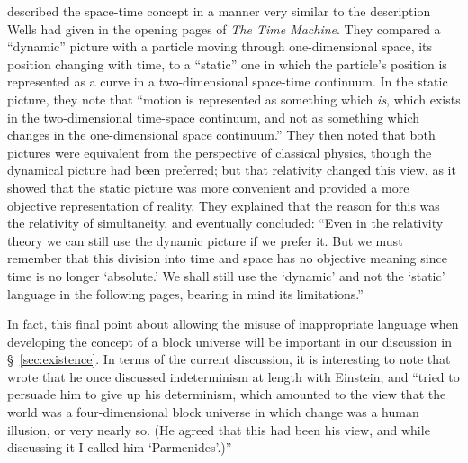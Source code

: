 \documentclass[aps,rmp,groupedaddress,twocolumn,10pt]{revtex4-2}
\begin{document}
\citet{Einstein1938} described the space-time concept in a manner very similar to the description Wells had given in the opening pages of \textit{The Time Machine}. They compared a ``dynamic'' picture with a particle moving through one-dimensional space, its position changing with time, to a ``static'' one in which the particle's position is represented as a curve in a two-dimensional space-time continuum. In the static picture, they note that ``motion is represented as something which \textit{is}, which exists in the two-dimensional time-space continuum, and not as something which changes in the one-dimensional space continuum.'' They then noted that both pictures were equivalent from the perspective of classical physics, though the dynamical picture had been preferred; but that relativity changed this view, as it showed that the static picture was more convenient and provided a more objective representation of reality. They explained that the reason for this was the relativity of simultaneity, and eventually concluded: ``Even in the relativity theory we can still use the dynamic picture if we prefer it. But we must remember that this division into time and space has no objective meaning since time is no longer `absolute.' We shall still use the `dynamic' and not the `static' language in the following pages, bearing in mind its limitations.''

In fact, this final point about allowing the misuse of inappropriate language when developing the concept of a block universe will be important in our discussion in \S~\ref{sec:existence}. In terms of the current discussion, it is interesting to note that \cite{Popper2002} wrote that he once discussed indeterminism at length with Einstein, and ``tried to persuade him to give up his determinism, which amounted to the view that the world was a four-dimensional block universe in which change was a human illusion, or very nearly so. (He agreed that this had been his view, and while discussing it I called him `Parmenides'.)''
\end{document}
